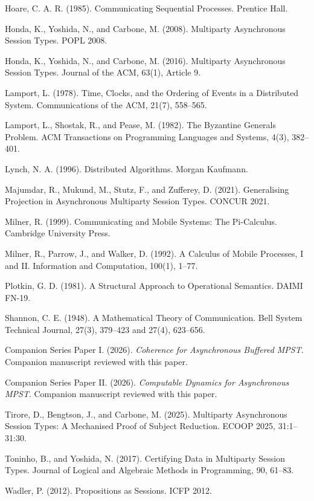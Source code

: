 \documentclass[a4paper,10pt,twocolumn,english]{article}
\numberwithin{equation}{section}
\theoremstyle{paperdef}
\theoremstyle{paperplain}
\theoremstyle{paperdef}
\theoremstyle{paperremark}
\theoremstyle{paperdef}
\newenvironment{citelist}{%
  \begin{list}{}{%
    \setlength{\leftmargin}{1.25em}%
    \setlength{\itemindent}{-1.25em}%
    \setlength{\itemsep}{2pt}%
    \setlength{\parsep}{0pt}%
    \setlength{\topsep}{3pt}}%
}{\end{list}}
\begin{document}
\begin{citelist}
	\item Hoare, C. A. R. (1985). Communicating Sequential Processes. Prentice Hall.
	\item Honda, K., Yoshida, N., and Carbone, M. (2008). Multiparty Asynchronous Session Types. POPL 2008.
	\item Honda, K., Yoshida, N., and Carbone, M. (2016). Multiparty Asynchronous Session Types. Journal of the ACM, 63(1), Article 9.
	\item Lamport, L. (1978). Time, Clocks, and the Ordering of Events in a Distributed System. Communications of the ACM, 21(7), 558--565.
	\item Lamport, L., Shostak, R., and Pease, M. (1982). The Byzantine Generals Problem. ACM Transactions on Programming Languages and Systems, 4(3), 382--401.
	\item Lynch, N. A. (1996). Distributed Algorithms. Morgan Kaufmann.
	\item Majumdar, R., Mukund, M., Stutz, F., and Zufferey, D. (2021). Generalising Projection in Asynchronous Multiparty Session Types. CONCUR 2021.
	\item Milner, R. (1999). Communicating and Mobile Systems: The Pi-Calculus. Cambridge University Press.
	\item Milner, R., Parrow, J., and Walker, D. (1992). A Calculus of Mobile Processes, I and II. Information and Computation, 100(1), 1--77.
	\item Plotkin, G. D. (1981). A Structural Approach to Operational Semantics. DAIMI FN-19.
	\item Shannon, C. E. (1948). A Mathematical Theory of Communication. Bell System Technical Journal, 27(3), 379--423 and 27(4), 623--656.
	\item Companion Series Paper I. (2026). \emph{Coherence for Asynchronous Buffered MPST}. Companion manuscript reviewed with this paper.
	\item Companion Series Paper II. (2026). \emph{Computable Dynamics for Asynchronous MPST}. Companion manuscript reviewed with this paper.
	\item Tirore, D., Bengtson, J., and Carbone, M. (2025). Multiparty Asynchronous Session Types: A Mechanised Proof of Subject Reduction. ECOOP 2025, 31:1--31:30.
	\item Toninho, B., and Yoshida, N. (2017). Certifying Data in Multiparty Session Types. Journal of Logical and Algebraic Methods in Programming, 90, 61--83.
	\item Wadler, P. (2012). Propositions as Sessions. ICFP 2012.
\end{citelist}
\end{document}
